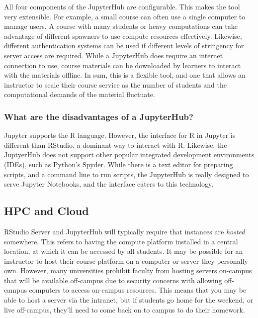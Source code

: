 All four components of the JupyterHub are configurable.
This makes the tool very extensible. 
For example, a small course can often use a single computer to manage users.
A course with many students or heavy computations can take advantage of different spawners to use compute resources effectively.
Likewise, different authentication systems can be used if different levels of stringency for server access are required.
While a JupyterHub does require an internet connection to use, course materials can be downloaded by learners to interact with the materials offline. 
In sum, this is a flexible tool, and one that allows an instructor to scale their course service as the number of students and the computational demands of the material fluctuate. 


\subsubsection{What are the disadvantages of a JupyterHub?}

Jupyter supports the R language.
However, the interface for R in Jupyter is different than RStudio, a dominant way to interact with R.
Likewise, the JuptyerHub does not support other popular integrated development environments (IDEs), such as Python's Spyder.
While there is a text editor for preparing scripts, and a command line to run scripts, the JupyterHub is really designed to serve Jupyter Notebooks, and the interface caters to this technology.



\subsection{HPC and Cloud}\label{HPC}

RStudio Server and JupyterHub will typically require that instances are \textit{hosted} somewhere.
This refers to having the compute platform installed in a central location, at which it can be accessed by all students.
It may be possible for an instructor to host their course platform on a computer or server they personally own.
However, many universities prohibit faculty from hosting servers on-campus that will be available off-campus due to security concerns with allowing off-campus computers to access on-campus resources.
This means that you may be able to host a server via the intranet, but if students go home for the weekend, or live off-campus, they'll need to come back on to campus to do their homework.

